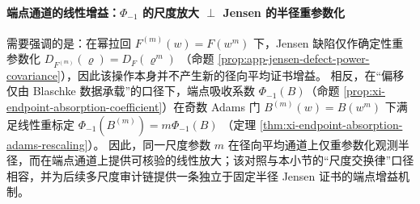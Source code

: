 \paragraph{端点通道的线性增益：\texorpdfstring{$\Phi_{-1}$}{Phi-1} 的尺度放大 \texorpdfstring{$\perp$}{⊥} Jensen 的半径重参数化}
需要强调的是：在幂拉回 \(F^{(m)}(w)=F(w^m)\) 下，Jensen 缺陷仅作确定性重参数化
\(
D_{F^{(m)}}(\varrho)=D_F(\varrho^m)
\)
（命题 \ref{prop:app-jensen-defect-power-covariance}），因此该操作本身并不产生新的径向平均证书增益。
相反，在“偏移仅由 Blaschke 数据承载”的口径下，端点吸收系数 \(\Phi_{-1}(B)\)（命题 \ref{prop:xi-endpoint-absorption-coefficient}）在奇数 Adams 门
\(
B^{(m)}(w)=B(w^m)
\)
下满足线性重标定
\(
\Phi_{-1}(B^{(m)})=m\Phi_{-1}(B)
\)
（定理 \ref{thm:xi-endpoint-absorption-adams-rescaling}）。
因此，同一尺度参数 \(m\) 在径向平均通道上仅重参数化观测半径，而在端点通道上提供可核验的线性放大；该对照与本小节的“尺度交换律”口径相容，并为后续多尺度审计链提供一条独立于固定半径 Jensen 证书的端点增益机制。

\endinput
